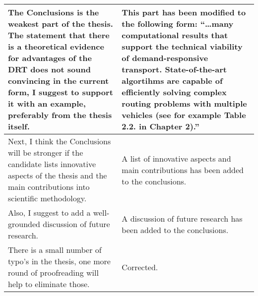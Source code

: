 \documentclass[a4paper,12pt]{article}
\begin{document}
\begin{longtable}{|p{}|p{}|}
\\ \hline
The Conclusions is the weakest part of the thesis. The statement that there is a theoretical
evidence for advantages of the DRT does not sound convincing in the current form, I suggest to
support it with an example, preferably from the thesis itself. 
& 
This part has been modified to the following form: ``\ldots many computational results
that support the technical viability of demand-responsive transport. State-of-the-art 
algortihms are capable of efficiently solving complex routing problems with multiple vehicles (see for example Table 2.2. in Chapter 2).''
\\ \hline
Next, I think the Conclusions will
be stronger if the candidate lists innovative aspects of the thesis and the main contributions into
scientific methodology. 
& 
A list of innovative aspects and main contributions has been added to the conclusions.
\\ \hline
Also, I suggest to add a well-grounded discussion of future research.
& 
A discussion of future research has been added to the conclusions.
\\ \hline
There is a small number of typo’s in the thesis, one more round of proofreading will help to
eliminate those.
& 
Corrected.
\\ \hline
\end{longtable}
\end{document}
